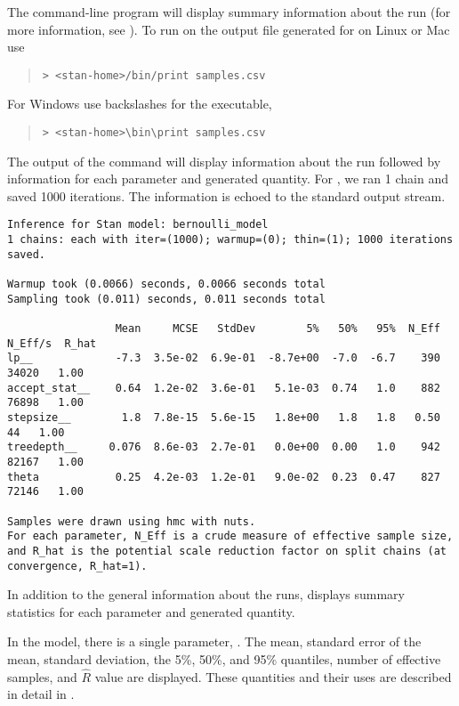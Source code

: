 The command-line program  will display summary
information about the run (for more information, see
). To run  on the output file
generated for  on Linux or Mac use
%
\begin{quote}
\begin{Verbatim}[fontshape=sl,fontsize=\small]
> <stan-home>/bin/print samples.csv
\end{Verbatim}
\end{quote}
%
For Windows use backslashes for the executable,
%
\begin{quote}
\begin{Verbatim}[fontshape=sl,fontsize=\small]
> <stan-home>\bin\print samples.csv
\end{Verbatim}
\end{quote}
%
The output of the command will display information about the run
followed by information for each parameter and generated quantity. For
, we ran 1 chain and saved 1000 iterations. The information is
echoed to the standard output stream.
%
\begin{Verbatim}[fontshape=sl,fontsize=\footnotesize]
Inference for Stan model: bernoulli_model
1 chains: each with iter=(1000); warmup=(0); thin=(1); 1000 iterations saved.

Warmup took (0.0066) seconds, 0.0066 seconds total
Sampling took (0.011) seconds, 0.011 seconds total

                 Mean     MCSE   StdDev        5%   50%   95%  N_Eff  N_Eff/s  R_hat
lp__             -7.3  3.5e-02  6.9e-01  -8.7e+00  -7.0  -6.7    390    34020   1.00
accept_stat__    0.64  1.2e-02  3.6e-01   5.1e-03  0.74   1.0    882    76898   1.00
stepsize__        1.8  7.8e-15  5.6e-15   1.8e+00   1.8   1.8   0.50       44   1.00
treedepth__     0.076  8.6e-03  2.7e-01   0.0e+00  0.00   1.0    942    82167   1.00
theta            0.25  4.2e-03  1.2e-01   9.0e-02  0.23  0.47    827    72146   1.00

Samples were drawn using hmc with nuts.
For each parameter, N_Eff is a crude measure of effective sample size,
and R_hat is the potential scale reduction factor on split chains (at 
convergence, R_hat=1).
\end{Verbatim}
%
In addition to the general information about the runs, 
displays summary statistics for each parameter and generated
quantity.

In the  model, there is a single parameter,
. The mean, standard error of the mean, standard
deviation, the 5\%, 50\%, and 95\% quantiles,
number of effective samples, and $\hat{R}$ value are displayed.
These quantities and their uses are described in detail in 
.

